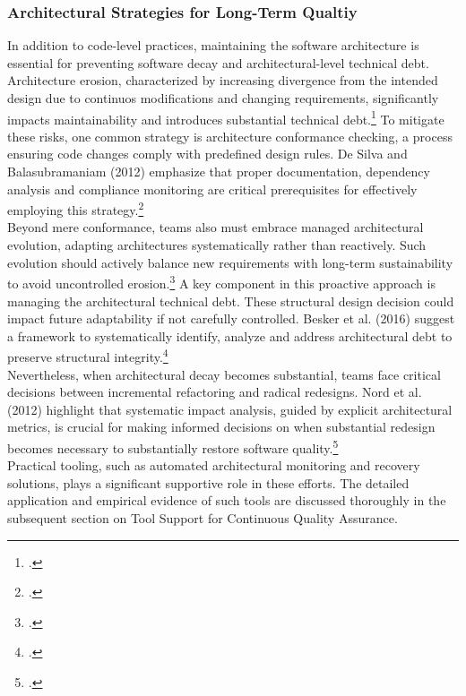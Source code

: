 \subsubsection{Architectural Strategies for Long-Term Qualtiy}
In addition to code-level practices, maintaining the software architecture is essential for preventing software decay and architectural-level technical debt. 
Architecture erosion, characterized by increasing divergence from the intended design due to continuos modifications and changing requirements,
significantly impacts maintainability and introduces substantial technical debt.\footcite[1]{desilvaControllingSoftwareArchitecture2012}
To mitigate these risks, one common strategy is architecture conformance checking, a process ensuring code changes comply with predefined design rules.
De Silva and Balasubramaniam (2012) emphasize that proper documentation, dependency analysis and compliance monitoring are critical prerequisites for
effectively employing this strategy.\footcite[135]{desilvaControllingSoftwareArchitecture2012}\\
Beyond mere conformance, teams also must embrace managed architectural evolution, adapting architectures systematically rather than reactively. Such evolution
should actively balance new requirements with long-term sustainability to avoid uncontrolled erosion.\footcite[34]{liUnderstandingSoftwareArchitecture2022}
A key component in this proactive approach is managing the architectural technical debt. These structural design decision could impact future adaptability if not
carefully controlled. Besker et al. (2016) suggest a framework to systematically identify, analyze and address architectural debt to preserve structural integrity.\footcite[11]{beskerManagingArchitecturalTechnical2018}\\
Nevertheless, when architectural decay becomes substantial, teams face critical decisions between incremental refactoring and radical redesigns.
Nord et al. (2012) highlight that systematic impact analysis, guided by explicit architectural metrics, is crucial for making informed decisions on when substantial 
redesign becomes necessary to substantially restore software quality.\footcite[99]{nordSearchMetricManaging2012}\\
Practical tooling, such as automated architectural monitoring and recovery solutions, plays a significant supportive role in these efforts. 
The detailed application and empirical evidence of such tools are discussed thoroughly in the subsequent section on Tool Support for Continuous Quality Assurance.\\

